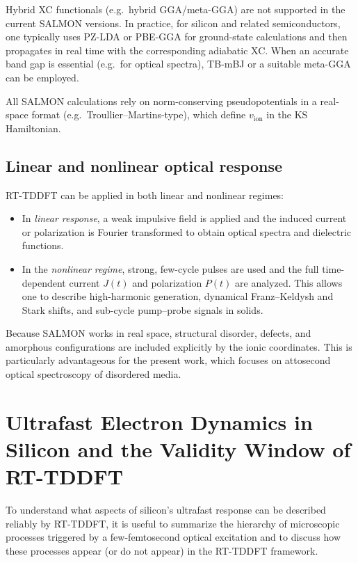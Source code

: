 Hybrid XC functionals (e.g.\ hybrid GGA/meta-GGA) are not supported in the current SALMON versions.\cite{SALMONmanual}
In practice, for silicon and related semiconductors, one typically uses PZ-LDA or PBE-GGA for ground-state calculations and then propagates in real time with the corresponding adiabatic XC.
When an accurate band gap is essential (e.g.\ for optical spectra), TB-mBJ or a suitable meta-GGA can be employed.\cite{Noda2019}

All SALMON calculations rely on norm-conserving pseudopotentials in a real-space format (e.g.\ Troullier--Martins-type), which define $v_{\mathrm{ion}}$ in the KS Hamiltonian.\cite{Noda2019,SALMONmanual}

\subsection{Linear and nonlinear optical response}

RT-TDDFT can be applied in both linear and nonlinear regimes:

\begin{itemize}
  \item In \emph{linear response}, a weak impulsive field is applied and the induced current or polarization is Fourier transformed to obtain optical spectra and dielectric functions.\cite{Yabana2012}

  \item In the \emph{nonlinear regime}, strong, few-cycle pulses are used and the full time-dependent current $J(t)$ and polarization $P(t)$ are analyzed.
        This allows one to describe high-harmonic generation, dynamical Franz--Keldysh and Stark shifts, and sub-cycle pump--probe signals in solids.\cite{Uemoto2019,Goncharov2013,Sato2025review}
\end{itemize}

Because SALMON works in real space, structural disorder, defects, and amorphous configurations are included explicitly by the ionic coordinates.\cite{Bondi2010,Dnaya2024}
This is particularly advantageous for the present work, which focuses on attosecond optical spectroscopy of disordered media.

\section{Ultrafast Electron Dynamics in Silicon and the Validity Window of RT-TDDFT}

To understand what aspects of silicon's ultrafast response can be described reliably by RT-TDDFT, it is useful to summarize the hierarchy of microscopic processes triggered by a few-femtosecond optical excitation and to discuss how these processes appear (or do not appear) in the RT-TDDFT framework.

